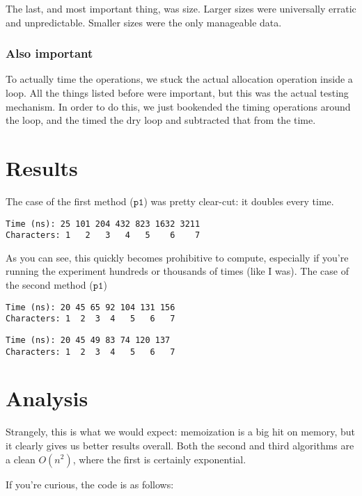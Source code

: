 \documentclass[a4paper]{article}
\begin{document}
The last, and most important thing, was size. Larger sizes were universally erratic and unpredictable. Smaller sizes were the only manageable data.

\subsubsection*{Also important}

To actually time the operations, we stuck the actual allocation operation inside a loop. All the things listed before were important, but this was the actual testing mechanism. In order to do this, we just bookended the timing operations around the loop, and the timed the dry loop and subtracted that from the time.

\section*{Results}

The case of the first method ($\texttt{p1}$) was pretty clear-cut: it doubles every time.
\begin{verbatim}
Time (ns): 25 101 204 432 823 1632 3211
Characters: 1   2   3   4   5    6    7
\end{verbatim}

As you can see, this quickly becomes prohibitive to compute, especially if you're running the experiment hundreds or thousands of times (like I was). The case of the second method ($\texttt{p1}$)

\begin{verbatim}
Time (ns): 20 45 65 92 104 131 156
Characters: 1  2  3  4   5   6   7
\end{verbatim}

\begin{verbatim}
Time (ns): 20 45 49 83 74 120 137
Characters: 1  2  3  4   5   6   7
\end{verbatim}

\section*{Analysis}

Strangely, this is what we would expect: memoization is a big hit on memory, but it clearly gives us better results overall. Both the second and third algorithms are a clean $O(n^2)$, where the first is certainly exponential.

If you're curious, the code is as follows:
\end{document}
